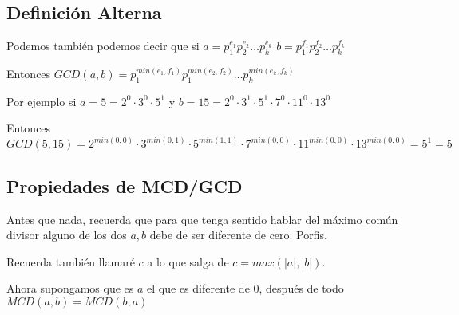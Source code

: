 \documentclass[12pt, fleqn]{report}                             %
\begin{document}
        \subsection*{Definición Alterna}

            Podemos también podemos decir que si
            $a = p_1^{e_1} p_2^{e_2} \dots p_k^{e_k}$
            $b = p_1^{f_1} p_2^{f_2} \dots p_k^{f_k}$

            Entonces $GCD(a, b) = p_1^{min(e_1, f_1)} p_1^{min(e_2, f_2)} \dots p_k^{min(e_k, f_k)}$


            Por ejemplo si $a = 5 = 2^0 \cdot 3^0 \cdot 5^1$ y
            $b = 15 = 2^0 \cdot 3^1 \cdot 5^1 \cdot 7^0 \cdot 11^0 \cdot 13^0$

            Entonces $GCD(5, 15) = 2^{min(0,0)} \cdot 3^{min(0,1)} \cdot 5^{min(1,1)} 
                        \cdot 7^{min(0,0)} \cdot 11^{min(0,0)} \cdot 13^{min(0,0)} = 5^1 = 5$


        \clearpage
        \subsection{Propiedades de MCD/GCD}

            Antes que nada, recuerda que para que tenga sentido hablar del máximo común divisor
            alguno de los dos $a,b$ debe de ser diferente de cero. Porfis.

            Recuerda también llamaré $c$ a lo que salga de $c=max(|a|,|b|)$.

            Ahora supongamos que es $a$ el que es diferente de 0, después de todo
            $MCD(a,b) = MCD(b,a)$
\end{document}
